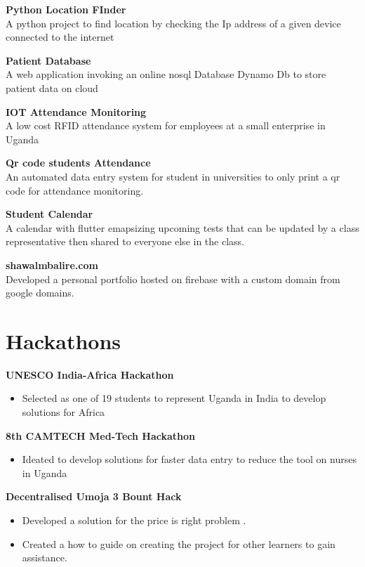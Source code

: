 \documentclass[a4paper]{article}
\begin{document}
\begin{minipage}[t]{0.5\textwidth}
        {\bf Python Location FInder}\\
        A python project to find location by checking the Ip address of a given device connected to the internet

        {\bf Patient Database}\\
        A web application invoking an online nosql Database Dynamo Db to store patient data on cloud

        {\bf IOT Attendance Monitoring}\\
        A low cost RFID attendance system for employees at a small enterprise in Uganda

        {\bf Qr code students Attendance}\\
        An automated data entry system for student in universities to only print a qr code for attendance monitoring.

        {\bf Student Calendar}\\
        A calendar with flutter emapsizing upcoming tests that can be updated by a class representative then shared to everyone else in the class.

        {\bf shawalmbalire.com}\\
        Developed a personal portfolio hosted on firebase with a custom domain from google domains.

        \section*{\bf Hackathons}

        {\bf UNESCO India-Africa Hackathon}
        \begin{itemize}[noitemsep]
            \item Selected as one of 19 students to represent Uganda in India to develop solutions for Africa
        \end{itemize}

        {\bf 8th CAMTECH Med-Tech Hackathon}
        \begin{itemize}
            \itemsep0em
            \item Ideated to develop solutions for faster data entry to reduce the tool on nurses in Uganda
        \end{itemize}

        {\bf Decentralised Umoja 3 Bount Hack}
        \begin{itemize}
            \itemsep0em
            \item Developed a solution for the price is right problem .
            \item Created a how to guide on creating the project for other learners to gain assistance.
        \end{itemize}

\end{minipage}
\end{document}
